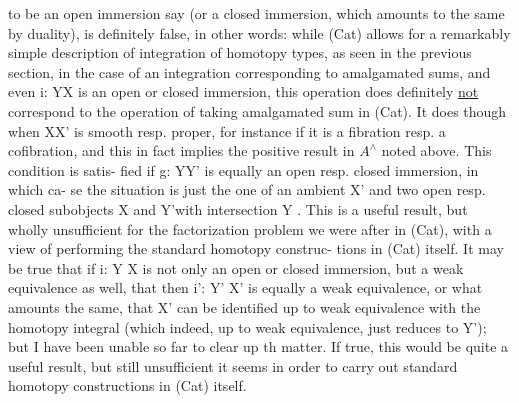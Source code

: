
to be an open immersion say (or a closed immersion,  which amounts to the
same by duality),  is definitely false,  in other words:  while (Cat)
allows for a remarkably simple description of integration of homotopy
types,  as seen in the previous section,  in the case of an integration
\hand{$\int$} \hand{(}corresponding to amalgamated sums\hand{)}, and even  i: Y\hand{$\rightarrow$}X is an
open or closed immersion,  this operation does definitely \uline{not} correspond
to the operation of taking amalgamated sum in (Cat).  It does though 
when X\hand{$\rightarrow$}X' is smooth resp. proper,  for instance if it is a fibration
resp. a cofibration,  and this in fact implies the positive result in $A^{\wedge}$
noted above.    This condition is satis-%
fied if g: Y\hand{$\rightarrow$}Y' is equally an open resp. closed immersion,  in which ca-%
se the situation is just the  one of an ambient X'\hand{,} and two open
resp. closed subobjects X and Y'\hand{,}with intersection Y .  This is a useful
result,  but wholly unsufficient for the factorization problem we were
after in (Cat),  with a view of performing the standard homotopy construc-%
tions in (Cat) itself.  It may be true that if i: Y\hand{$\rightarrow$} X is not only an
open or closed immersion,  but a weak equivalence as well,  that then
i': Y' \hand{$\rightarrow$}X' is equally a weak equivalence,  or what amounts the same,  that
X' can be identified up to weak equivalence with the homotopy integral
(which indeed,  up to weak equivalence,  just reduces to Y');  but I have
been unable so far to clear up th matter.  If true,  this would be quite
a useful result,  but still unsufficient it seems in order to carry out 
standard homotopy constructions in (Cat) itself.

